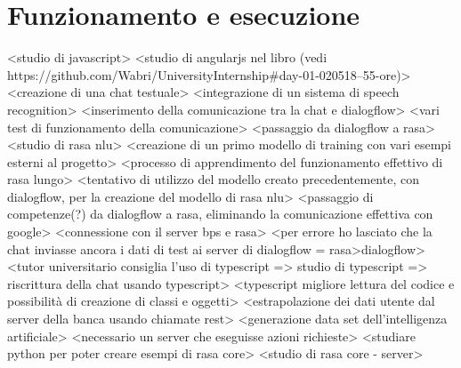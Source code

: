 \section{Funzionamento e esecuzione}


<studio di javascript>
<studio di angularjs nel libro (vedi https://github.com/Wabri/UniversityInternship#day-01-020518--55-ore)>
<creazione di una chat testuale>
<integrazione di un sistema di speech recognition>
<inserimento della comunicazione tra la chat e dialogflow>
<vari test di funzionamento della comunicazione>
<passaggio da dialogflow a rasa>
<studio di rasa nlu>
<creazione di un primo modello di training con vari esempi esterni al progetto>
<processo di apprendimento del funzionamento effettivo di rasa lungo>
<tentativo di utilizzo del modello creato precedentemente, con dialogflow, per la creazione del modello di rasa nlu>
<passaggio di competenze(?) da dialogflow a rasa, eliminando la comunicazione effettiva con google>
<connessione con il server bps e rasa>
<per errore ho lasciato che la chat inviasse ancora i dati di test ai server di dialogflow = rasa>dialogflow>
<tutor universitario consiglia l'uso di typescript => studio di typescript => riscrittura della chat usando typescript>
<typescript migliore lettura del codice e possibilità di creazione di classi e oggetti>
<estrapolazione dei dati utente dal server della banca usando chiamate rest>
<generazione data set dell'intelligenza artificiale>
<necessario un server che eseguisse azioni richieste>
<studiare python per poter creare esempi di rasa core>
<studio di rasa core - server>















